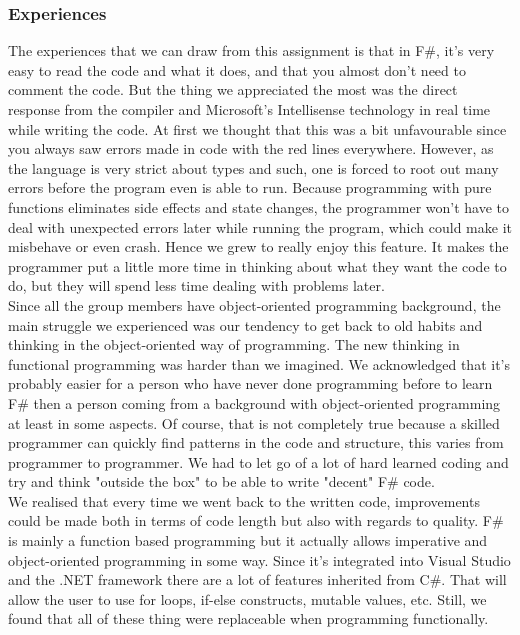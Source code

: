 \documentclass[12pt, a4paper]{article}
\begin{document}
\subsubsection{Experiences}
The experiences that we can draw from this assignment is that in F\#, it's very easy to read the code and what it does, and that you almost don't need to comment the code. But the thing we appreciated the most was the direct response from the compiler and Microsoft's Intellisense technology in real time while writing the code. At first we thought that this was a bit unfavourable since you always saw errors made in code with the red lines everywhere. However, as the language is very strict about types and such, one is forced to root out many errors before the program even is able to run. Because programming with pure functions eliminates side effects and state changes, the programmer won't have to deal with unexpected errors later while running the program, which could make it misbehave or even crash. Hence we grew to really enjoy this feature. It makes the programmer put a little more time in thinking about what they want the code to do, but they will spend less time dealing with problems later.\\

Since all the group members have object-oriented programming background, the main struggle we experienced was our tendency to get back to old habits and thinking in the object-oriented way of programming. The new thinking in functional programming was harder than we imagined. We acknowledged that it's probably easier for a person who have never done programming before to learn F\# then a person coming from a background with object-oriented programming at least in some aspects. Of course, that is not completely true because a skilled programmer can quickly find patterns in the code and structure, this varies from programmer to programmer. We had to let go of a lot of hard learned coding and try and think "outside the box" to be able to write "decent" F\# code.\\

We realised that every time we went back to the written code, improvements could be made both in terms of code length but also with regards to quality. F\# is mainly a function based programming but it actually allows imperative and object-oriented programming in some way. Since it's integrated into Visual Studio and the .NET framework there are a lot of features inherited from C\#. That will allow the user to use for loops, if-else constructs, mutable values, etc. Still, we found that all of these thing were replaceable when programming functionally.\\
\end{document}

